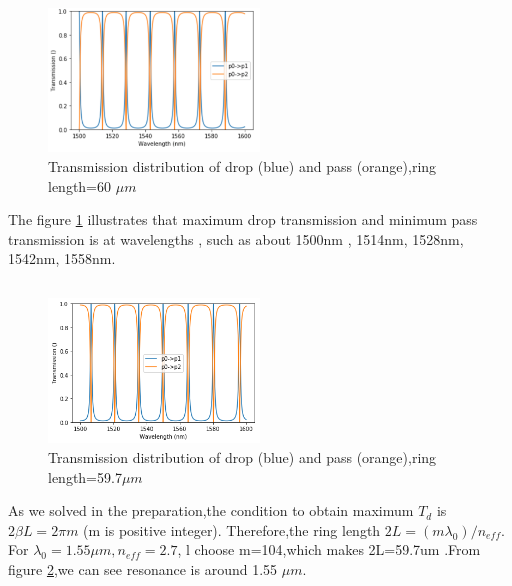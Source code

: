 \documentclass[fontsize=11pt]{scrartcl}
\begin{document}
\subsection{}
\begin{figure}[htbp]
    \centering
    \includegraphics[width=0.5\textwidth]{img/T2_1.png}
    \caption{Transmission distribution of drop (blue) and pass (orange),ring length=60 $\mu m$}
    \label{t2_1}
\end{figure}
The figure \ref{t2_1} illustrates that maximum drop transmission and minimum pass transmission is at wavelengths ,
such as about 1500nm , 1514nm, 1528nm, 1542nm, 1558nm.
\subsection{}
\begin{figure}[h]
    \centering
    \includegraphics[width=0.5\textwidth]{img/T2_2.png}
    \caption{Transmission distribution of drop (blue) and pass (orange),ring length=59.7$\mu m$}
    \label{t2_2}
\end{figure}
As we solved in the preparation,the condition to obtain maximum 
$T_d $ is$ 2\beta L=2\pi m$ (m is positive integer).
Therefore,the ring length $2L=(mλ_0)/n_{eff} $. 
 For $λ_0  =1.55\mu m,n_{eff} =2.7$, l choose m=104,which makes 2L=59.7um .From figure \ref{t2_2},we can see resonance is around 1.55 $\mu m$.
\end{document}
